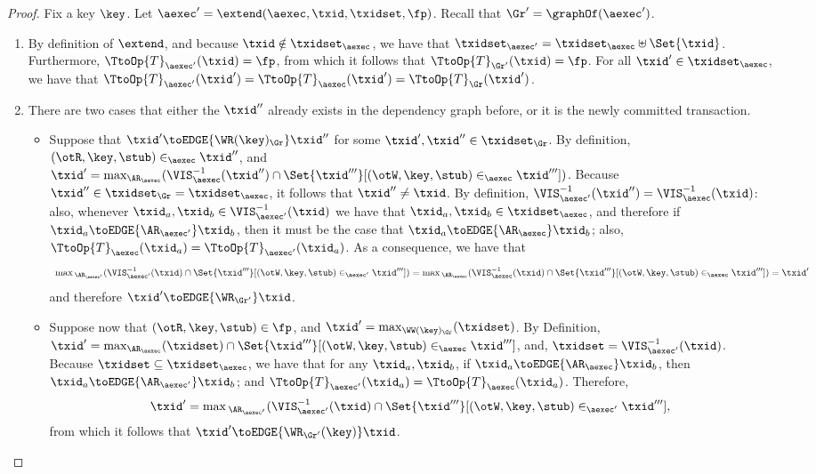 \begin{proof}
Fix a key $\key$. Let $\aexec' = \extend(\aexec, \txid, \txidset, \fp)$. Recall that $\Gr' = \graphOf(\aexec')$.

\begin{enumerate}
\item By definition of $\extend$, and 
because $\txid \notin \txidset_{\aexec}$, we have that 
$\txidset_{\aexec'} = \txidset_{\aexec} \uplus \Set{\txid}$. Furthermore, $\TtoOp{T}_{\aexec'}(\txid) = \fp$, 
from which it follows that $\TtoOp{T}_{\Gr'}(\txid) = \fp$.
For all $\txid' \in \txidset_{\aexec}$, we have that $\TtoOp{T}_{\aexec'}(\txid') = 
\TtoOp{T}_{\aexec}(\txid') = \TtoOp{T}_{\Gr}(\txid')$.
\item
There are two cases that either the \( \txid'' \) already exists in the dependency graph before,
or it is the newly committed transaction.
\begin{itemize}
\item Suppose that $\txid' \toEDGE{\WR(\key)_{\Gr}} \txid''$ for some $\txid', \txid'' \in \txidset_{\Gr}$. 
By definition, $(\otR, \key, \stub) \in_{\aexec} \txid''$,  
and $\txid' = \max_{\AR_{\aexec}}(\VIS_{\aexec}^{-1}(\txid'') \cap \Set{\txid'''}[(\otW, \key, \stub) \in_{\aexec} \txid'''])$. 
Because $\txid'' \in \txidset_{\Gr} = \txidset_{\aexec}$, it follows that $\txid'' \neq \txid$. By definition, 
$\VIS^{-1}_{\aexec'}(\txid'') = \VIS^{-1}_{\aexec}(\txid)$: also, whenever 
$\txid_{a}, \txid_{b} \in \VIS^{-1}_{\aexec'}(\txid)$ we have that $\txid_{a}, \txid_{b} \in \txidset_{\aexec}$, 
and therefore if $\txid_{a} \toEDGE{\AR_{\aexec'}} \txid_{b}$, then it must be the case 
that $\txid_{a} \toEDGE{\AR_{\aexec}} \txid_b$; also, $\TtoOp{T}_{\aexec}(\txid_{a}) = \TtoOp{T}_{\aexec'}(\txid_{a})$. 
As a consequence, we have that 
\[
    \begin{array}{l}
        \max{}_{\AR_{\aexec'}}(\VIS^{-1}_{\aexec'}(\txid) \cap \Set{ \txid'''}[(\otW, \key, \stub) \in_{\aexec'} \txid''']) =
        \max{}_{\AR_{\aexec}}(\VIS^{-1}_{\aexec}(\txid) \cap \Set{\txid'''}[(\otW, \key, \stub) \in_{\aexec} \txid''']) = \txid'
    \end{array}
\] 
and therefore $\txid' \toEDGE{\WR_{\Gr'}} \txid$. 

\item Suppose now that $(\otR,\key, \stub) \in \fp$, and $\txid' = \max_{\WW(\key)_{\Gr}}(\txidset)$. 
    By Definition, $\txid' = \max_{\AR_{\aexec}}(\txidset) \cap \Set{\txid'''}[(\otW, \key, \stub) \in_{\aexec} \txid''']$, 
and, $\txidset = \VIS^{-1}_{\aexec'}(\txid)$.
Because $\txidset \subseteq \txidset_{\aexec}$, we have 
that for any $\txid_{a}, \txid_{b}$, if $\txid_{a} \toEDGE{\AR_{\aexec}} \txid_{b}$, 
then $\txid_{a} \toEDGE{\AR_{\aexec'}} \txid_{b}$; and $\TtoOp{T}_{\aexec'}(\txid_{a}) = 
\TtoOp{T}_{\aexec}(\txid_a)$. Therefore, 
\[
    \txid' = \max{}_{\AR_{\aexec'}}(\VIS^{-1}_{\aexec'}(\txid) \cap \Set{\txid'''}[(\otW, \key, \stub) \in_{\aexec'} \txid'''], 
\] 
from which it follows that $\txid' \toEDGE{\WR_{\Gr'}(\key)}\txid$.


\end{itemize}
\end{enumerate}
\end{proof}
